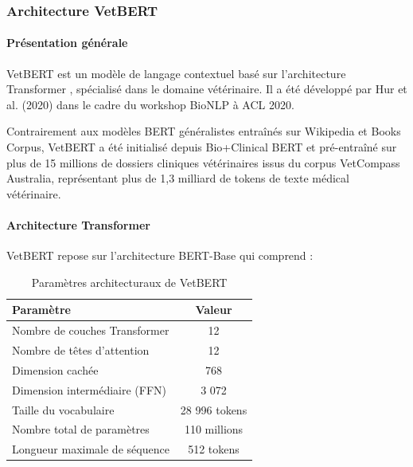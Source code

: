 \subsubsection{Architecture VetBERT}

\paragraph{Présentation générale}

VetBERT \cite{hur2020vetbert} est un modèle de langage contextuel basé sur l'architecture Transformer \cite{vaswani2017attention}, spécialisé dans le domaine vétérinaire. Il a été développé par Hur et al. (2020) dans le cadre du workshop BioNLP à ACL 2020.

Contrairement aux modèles BERT généralistes entraînés sur Wikipedia et Books Corpus, VetBERT a été initialisé depuis Bio+Clinical BERT et pré-entraîné sur plus de 15 millions de dossiers cliniques vétérinaires issus du corpus VetCompass Australia, représentant plus de 1,3 milliard de tokens de texte médical vétérinaire.

\paragraph{Architecture Transformer}

VetBERT repose sur l'architecture BERT-Base qui comprend :

\begin{table}[H]
\centering
\caption{Paramètres architecturaux de VetBERT}
\label{tab:vetbert-arch}
\renewcommand{\arraystretch}{1.4}
\begin{tabular}{|l|c|}
\hline
\textbf{Paramètre} & \textbf{Valeur} \\
\hline
Nombre de couches Transformer & 12 \\
Nombre de têtes d'attention   & 12 \\
Dimension cachée              & 768 \\
Dimension intermédiaire (FFN) & 3 072 \\
Taille du vocabulaire         & 28 996 tokens \\
Nombre total de paramètres    & 110 millions \\
Longueur maximale de séquence & 512 tokens \\
\hline
\end{tabular}
\end{table}

